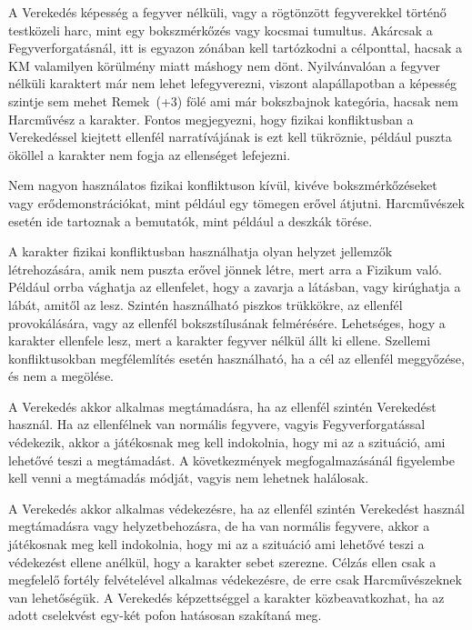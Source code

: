 
A Verekedés képesség a fegyver nélküli, vagy a rögtönzött fegyverekkel történő testközeli harc, mint egy bokszmérkőzés vagy kocsmai tumultus. Akárcsak a Fegyverforgatásnál, itt is egyazon zónában kell tartózkodni a célponttal, hacsak a KM valamilyen körülmény miatt máshogy nem dönt. Nyilvánvalóan a fegyver nélküli karaktert már nem lehet lefegyverezni, viszont alapállapotban a képesség szintje sem mehet Remek~(+3) fölé ami már bokszbajnok kategória, hacsak nem Harcművész a karakter. Fontos megjegyezni, hogy fizikai konfliktusban a Verekedéssel kiejtett ellenfél narratívájának is ezt kell tükröznie, például puszta ököllel a karakter nem fogja az ellenséget lefejezni.

\overcome Nem nagyon használatos fizikai konfliktuson kívül, kivéve bokszmérkőzéseket vagy erődemonstrációkat, mint például egy tömegen erővel átjutni. Harcművészek esetén ide tartoznak a bemutatók, mint például a deszkák törése.

\advantage A karakter fizikai konfliktusban használhatja olyan helyzet jellemzők létrehozására, amik nem puszta erővel jönnek létre, mert arra a Fizikum való. Például orrba vághatja az ellenfelet, hogy a  zavarja a látásban, vagy kirúghatja a lábát, amitől az  lesz. Szintén használható piszkos trükkökre, az ellenfél provokálására, vagy az ellenfél bokszstílusának felmérésére. Lehetséges, hogy a karakter ellenfele  lesz, mert a karakter fegyver nélkül állt ki ellene. Szellemi konfliktusokban megfélemlítés esetén használható, ha a cél az ellenfél meggyőzése, és nem a megölése.

\attack A Verekedés akkor alkalmas megtámadásra, ha az ellenfél szintén Verekedést használ. Ha az ellenfélnek van normális fegyvere, vagyis Fegyverforgatással védekezik, akkor a játékosnak meg kell indokolnia, hogy mi az a szituáció, ami lehetővé teszi a megtámadást. A következmények megfogalmazásánál figyelembe kell venni a megtámadás módját, vagyis nem lehetnek halálosak.

 A Verekedés akkor alkalmas védekezésre, ha az ellenfél szintén Verekedést használ megtámadásra vagy helyzetbehozásra, de ha van normális fegyvere, akkor a játékosnak meg kell indokolnia, hogy mi az a szituáció ami lehetővé teszi a védekezést ellene anélkül, hogy a karakter sebet szerezne. Célzás ellen csak a megfelelő fortély felvételével alkalmas védekezésre, de erre csak Harcművészeknek van lehetőségük. A Verekedés képzettséggel a karakter közbeavatkozhat, ha az adott cselekvést egy-két pofon hatásosan szakítaná meg.

